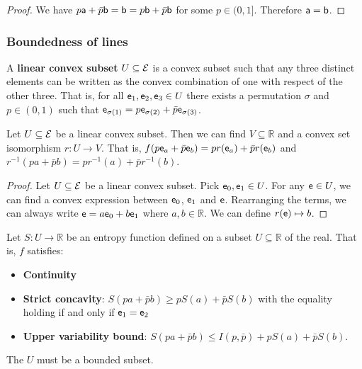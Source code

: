 \begin{proof}
	We have $p\ens[a] + \bar{p} \ens[b] = \ens[b] = p\ens[b] + \bar{p} \ens[b]$ for some $p \in (0,1]$. Therefore $\ens[a] = \ens[b]$.
\end{proof}




\subsubsection{Boundedness of lines}

\begin{defn}
	A \textbf{linear convex subset} $U \subseteq \Ens$ is a convex subset such that any three distinct elements can be written as the convex combination of one with respect of the other three. That is, for all $\ens_1, \ens_2, \ens_3 \in U$ there exists a permutation $\sigma$ and $p \in (0,1)$ such that $\ens_{\sigma(1)} = p \ens_{\sigma(2)} + \bar{p} \ens_{\sigma(3)}	$.
\end{defn}

\begin{prop}
	Let $U \subseteq \Ens$ be a linear convex subset. Then we can find $V \subseteq \mathbb{R}$ and a convex set isomorphism $r : U \to V$. That is, $f(p \ens_a + \bar{p} \ens_b) = p r(\ens_a) + \bar{p} r(\ens_b)$ and $r^{-1} (p a + \bar{p} b) = p r^{-1} (a) + \bar{p} r^{-1} (b)$.
\end{prop}

\begin{proof}
	Let $U \subseteq \Ens$ be a linear convex subset. Pick $\ens_0, \ens_1 \in U$. For any $\ens \in U$, we can find a convex expression between $\ens_0$, $\ens_1$ and $\ens$. Rearranging the terms, we can always write $\ens = a\ens_0 + b\ens_1$ where $a,b \in \mathbb{R}$. We can define $r(\ens) \mapsto b$.
\end{proof}

\begin{prop}
	Let $S : U \to \mathbb{R}$ be an entropy function defined on a subset $U \subseteq \mathbb{R}$ of the real. That is, $f$ satisfies:
	\begin{itemize}
		\item \textbf{Continuity}
		\item \textbf{Strict concavity}: $S(p a + \bar{p} b) \geq p S(a) + \bar{p} S(b)$ with the equality holding if and only if $\ens_1 = \ens_2$
		\item \textbf{Upper variability bound}: $S(p a + \bar{p} b) \leq I(p, \bar{p}) + p S(a) + \bar{p} S(b)$.
	\end{itemize}
	The $U$ must be a bounded subset.
\end{prop}

